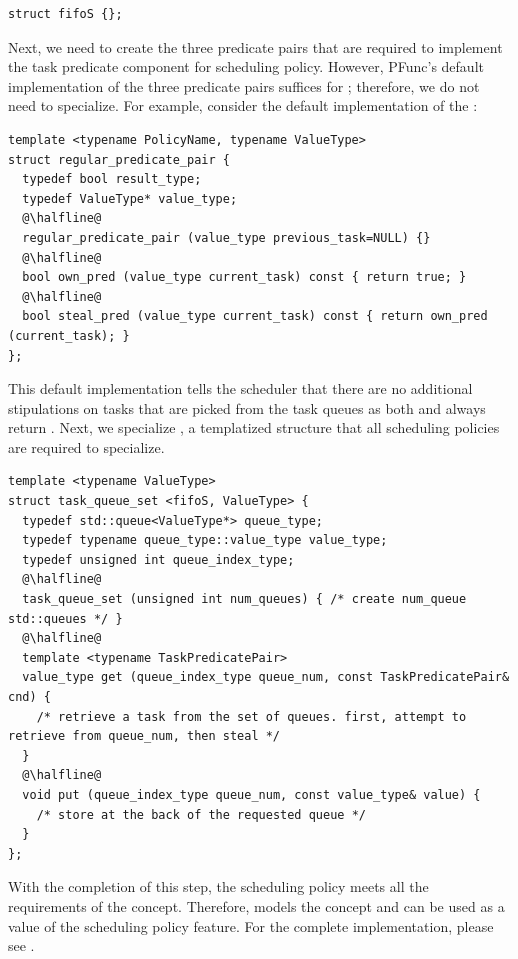 \begin{lstlisting}
struct fifoS {}; 
\end{lstlisting}

\noindent
Next, we need to create the three predicate pairs that are required to
implement the task predicate component for  scheduling policy.
%
However, PFunc's default implementation of the three predicate pairs suffices
for ; therefore, we do not need to specialize.
%
For example, consider the default implementation of the
:
%
\begin{lstlisting}
template <typename PolicyName, typename ValueType>
struct regular_predicate_pair {
  typedef bool result_type;
  typedef ValueType* value_type;
  @\halfline@
  regular_predicate_pair (value_type previous_task=NULL) {}
  @\halfline@
  bool own_pred (value_type current_task) const { return true; }
  @\halfline@
  bool steal_pred (value_type current_task) const { return own_pred (current_task); }
};
\end{lstlisting}
%
\noindent
This default implementation tells the scheduler that there are no additional
stipulations on tasks that are picked from the task queues as both
 and  always return .
%
Next, we specialize , a templatized structure that all 
scheduling policies are required to specialize.
%
\begin{lstlisting}[columns=flexible]
template <typename ValueType>
struct task_queue_set <fifoS, ValueType> {
  typedef std::queue<ValueType*> queue_type;
  typedef typename queue_type::value_type value_type;
  typedef unsigned int queue_index_type; 
  @\halfline@
  task_queue_set (unsigned int num_queues) { /* create num_queue std::queues */ }
  @\halfline@
  template <typename TaskPredicatePair>
  value_type get (queue_index_type queue_num, const TaskPredicatePair& cnd) {
    /* retrieve a task from the set of queues. first, attempt to retrieve from queue_num, then steal */
  }
  @\halfline@
  void put (queue_index_type queue_num, const value_type& value) { 
    /* store at the back of the requested queue */ 
  }
};
\end{lstlisting}
%
\noindent
With the completion of this step, the  scheduling policy meets all
the requirements of the  concept.
%
Therefore,  models the  concept and can
be used as a value of the scheduling policy feature.
%
For the complete implementation, please see .

